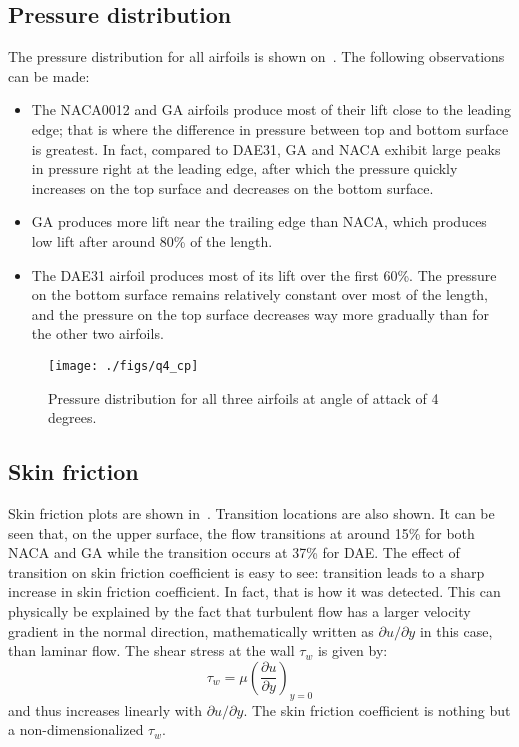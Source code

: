 \subsection{Pressure distribution}
The pressure distribution for all airfoils is shown on~. The following
observations can be made:
\begin{itemize}
    \item The NACA0012 and GA airfoils produce most of their lift close to the leading edge;
        that is where the difference in pressure between top and bottom surface is greatest.
        In fact, compared to DAE31, GA and NACA exhibit large peaks in pressure
        right at the leading edge, after which the pressure quickly increases on the top surface
        and decreases on the bottom surface.
    \item GA produces more lift near the trailing edge than NACA, which produces
        low lift after around 80\% of the length.
    \item The DAE31 airfoil produces most of its lift over the first 60\%. The pressure
        on the bottom surface remains relatively constant over most of the length, and the
        pressure on the top surface decreases way more gradually than for the other two
        airfoils.
\end{itemize}

\begin{figure}
    \centering
    \texttt{[image: ./figs/q4\_cp]}
    \caption{Pressure distribution for all three airfoils at angle of attack of
        4 degrees.}\label{fig:q4_cp}
\end{figure}

\subsection{Skin friction}
Skin friction plots are shown in~. Transition locations are also shown.
It can be seen that, on the upper surface, the flow transitions at around 15\%
for both NACA and GA while the transition occurs at 37\% for DAE. The effect
of transition on skin friction coefficient is easy to see: transition leads to a sharp increase
in skin friction coefficient. In fact, that is how it was detected. This can physically
be explained by the fact that turbulent flow has a larger velocity gradient in the normal
direction, mathematically written as $\partial u/\partial y$ in this case, than laminar flow.
The shear stress at the wall $\tau_w$ is given by:
$$
    \tau_w = \mu \left(\frac{\partial u}{\partial y}\right)_{y=0}
$$
and thus increases linearly with $\partial u/\partial y$. The skin friction coefficient
is nothing but a non-dimensionalized $\tau_w$.

